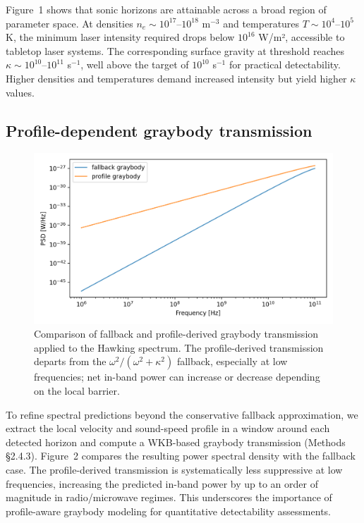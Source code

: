 \documentclass[11pt]{article}
\begin{document}
Figure~1 shows that sonic horizons are attainable across a broad region of parameter space. At densities $n_e \sim 10^{17}$--$10^{18}$ m$^{-3}$ and temperatures $T \sim 10^4$--$10^5$ K, the minimum laser intensity required drops below $10^{16}$ W/m², accessible to tabletop laser systems. The corresponding surface gravity at threshold reaches $\kappa \sim 10^{10}$--$10^{11}$ s$^{-1}$, well above the target of $10^{10}$ s$^{-1}$ for practical detectability. Higher densities and temperatures demand increased intensity but yield higher $\kappa$ values.

\subsection{Profile-dependent graybody transmission}
\begin{figure}[h]
  \centering
  \includegraphics[width=0.8\linewidth]{figures/graybody_impact.png}
  \caption{Comparison of fallback and profile-derived graybody transmission applied to the Hawking spectrum. The profile-derived transmission departs from the $\omega^2/(\omega^2+\kappa^2)$ fallback, especially at low frequencies; net in-band power can increase or decrease depending on the local barrier.}
\end{figure}

To refine spectral predictions beyond the conservative fallback approximation, we extract the local velocity and sound-speed profile in a window around each detected horizon and compute a WKB-based graybody transmission (Methods §2.4.3). Figure~2 compares the resulting power spectral density with the fallback case. The profile-derived transmission is systematically less suppressive at low frequencies, increasing the predicted in-band power by up to an order of magnitude in radio/microwave regimes. This underscores the importance of profile-aware graybody modeling for quantitative detectability assessments.
\end{document}
